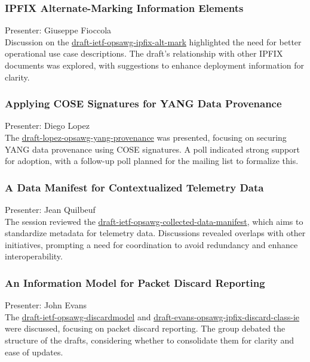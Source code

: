 \documentclass{article}
\begin{document}
\subsubsection{IPFIX Alternate-Marking Information Elements}
Presenter: Giuseppe Fioccola \\
Discussion on the \href{https://datatracker.ietf.org/doc/html/draft-ietf-opsawg-ipfix-alt-mark}{draft-ietf-opsawg-ipfix-alt-mark} highlighted the need for better operational use case descriptions. The draft's relationship with other IPFIX documents was explored, with suggestions to enhance deployment information for clarity.

\subsubsection{Applying COSE Signatures for YANG Data Provenance}
Presenter: Diego Lopez \\
The \href{https://datatracker.ietf.org/doc/html/draft-lopez-opsawg-yang-provenance}{draft-lopez-opsawg-yang-provenance} was presented, focusing on securing YANG data provenance using COSE signatures. A poll indicated strong support for adoption, with a follow-up poll planned for the mailing list to formalize this.

\subsubsection{A Data Manifest for Contextualized Telemetry Data}
Presenter: Jean Quilbeuf \\
The session reviewed the \href{https://datatracker.ietf.org/doc/html/draft-ietf-opsawg-collected-data-manifest}{draft-ietf-opsawg-collected-data-manifest}, which aims to standardize metadata for telemetry data. Discussions revealed overlaps with other initiatives, prompting a need for coordination to avoid redundancy and enhance interoperability.

\subsubsection{An Information Model for Packet Discard Reporting}
Presenter: John Evans \\
The \href{https://datatracker.ietf.org/doc/html/draft-ietf-opsawg-discardmodel}{draft-ietf-opsawg-discardmodel} and \href{https://datatracker.ietf.org/doc/html/draft-evans-opsawg-ipfix-discard-class-ie}{draft-evans-opsawg-ipfix-discard-class-ie} were discussed, focusing on packet discard reporting. The group debated the structure of the drafts, considering whether to consolidate them for clarity and ease of updates.
\end{document}
